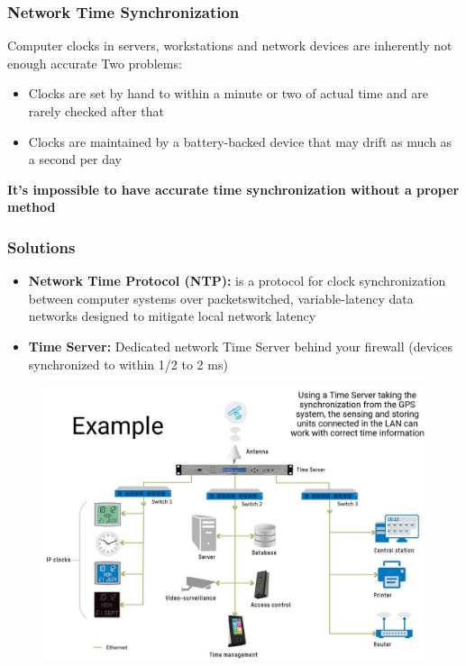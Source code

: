 \subsubsection{Network Time Synchronization}
Computer clocks in servers, workstations and network devices are inherently not enough accurate
Two problems:
\begin{itemize}
    \item Clocks are set by hand to within a minute or two of actual time and are rarely checked after that 
    \item Clocks are maintained by a battery-backed device that may drift as much as a second per day 
\end{itemize}
\noindent \textbf{It’s impossible to have accurate time synchronization without a proper method}

\subsubsection{Solutions}
\begin{itemize}
    \item \textbf{Network Time Protocol (NTP):} is a protocol for clock synchronization between computer systems over packetswitched, variable-latency data networks designed to mitigate local network latency 
    \item \textbf{Time Server:} Dedicated network Time Server behind your firewall (devices synchronized to within 1/2 to 2 ms)
\end{itemize}

\begin{figure}[H]
    \centering
    \includegraphics[width=0.8\linewidth]{07-08/images/sync.png}
\end{figure}


